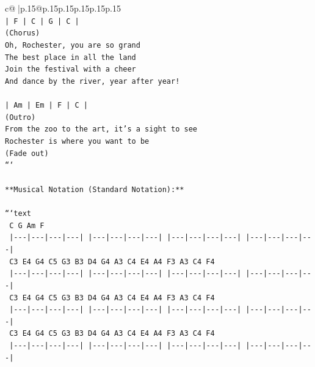 \documentclass{article}
\begin{document}
{\begin{supertabular}{c@{$\;$}|p{.15\linewidth}@{}p{.15\linewidth}p{.15\linewidth}p{.15\linewidth}p{.15\linewidth}p{.15\linewidth}}
{{{\\ 
\texttt{| F   | C   | G   | C   |} \\
\texttt{(Chorus)} \\
\texttt{Oh, Rochester, you are so grand} \\
\texttt{The best place in all the land} \\
\texttt{Join the festival with a cheer} \\
\texttt{And dance by the river, year after year!} \\
\\ 
\texttt{| Am  | Em  | F   | C   |} \\
\texttt{(Outro)} \\
\texttt{From the zoo to the art, it's a sight to see} \\
\texttt{Rochester is where you want to be} \\
\texttt{(Fade out)} \\
\texttt{```} \\
\\ 
\texttt{**Musical Notation (Standard Notation):**} \\
\\ 
\texttt{```text} \\
\texttt{      C           G           Am          F} \\
\texttt{      |{-}{-}{-}|{-}{-}{-}|{-}{-}{-}|{-}{-}{-}|   |{-}{-}{-}|{-}{-}{-}|{-}{-}{-}|{-}{-}{-}|   |{-}{-}{-}|{-}{-}{-}|{-}{-}{-}|{-}{-}{-}|   |{-}{-}{-}|{-}{-}{-}|{-}{-}{-}|{-}{-}{-}|} \\
\texttt{      C3  E4  G4  C5     G3  B3  D4  G4     A3  C4  E4  A4     F3  A3  C4  F4} \\
\texttt{      |{-}{-}{-}|{-}{-}{-}|{-}{-}{-}|{-}{-}{-}|   |{-}{-}{-}|{-}{-}{-}|{-}{-}{-}|{-}{-}{-}|   |{-}{-}{-}|{-}{-}{-}|{-}{-}{-}|{-}{-}{-}|   |{-}{-}{-}|{-}{-}{-}|{-}{-}{-}|{-}{-}{-}|} \\
\texttt{      C3  E4  G4  C5     G3  B3  D4  G4     A3  C4  E4  A4     F3  A3  C4  F4} \\
\texttt{      |{-}{-}{-}|{-}{-}{-}|{-}{-}{-}|{-}{-}{-}|   |{-}{-}{-}|{-}{-}{-}|{-}{-}{-}|{-}{-}{-}|   |{-}{-}{-}|{-}{-}{-}|{-}{-}{-}|{-}{-}{-}|   |{-}{-}{-}|{-}{-}{-}|{-}{-}{-}|{-}{-}{-}|} \\
\texttt{      C3  E4  G4  C5     G3  B3  D4  G4     A3  C4  E4  A4     F3  A3  C4  F4} \\
\texttt{      |{-}{-}{-}|{-}{-}{-}|{-}{-}{-}|{-}{-}{-}|   |{-}{-}{-}|{-}{-}{-}|{-}{-}{-}|{-}{-}{-}|   |{-}{-}{-}|{-}{-}{-}|{-}{-}{-}|{-}{-}{-}|   |{-}{-}{-}|{-}{-}{-}|{-}{-}{-}|{-}{-}{-}|} \\
}}}
\end{supertabular}}
\end{document}
